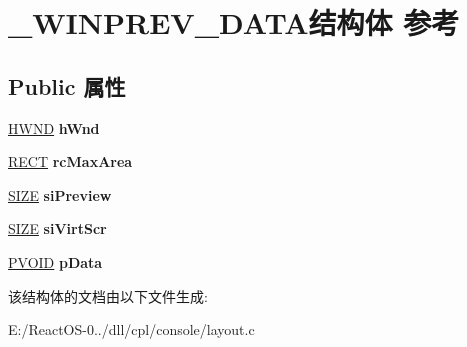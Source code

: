 \hypertarget{struct___w_i_n_p_r_e_v___d_a_t_a}{}\section{\+\_\+\+W\+I\+N\+P\+R\+E\+V\+\_\+\+D\+A\+T\+A结构体 参考}
\label{struct___w_i_n_p_r_e_v___d_a_t_a}
\subsection*{Public 属性}
\begin{DoxyCompactItemize}
\item 
\mbox{\label{struct___w_i_n_p_r_e_v___d_a_t_a_acf0d1ded946db1cfca1720317bf0321d}} 
\hyperlink{interfacevoid}{H\+W\+ND} {\bfseries h\+Wnd}
\item 
\mbox{\label{struct___w_i_n_p_r_e_v___d_a_t_a_a66a83b6289aa96a71e0d5b26944b5e81}} 
\hyperlink{structtag_r_e_c_t}{R\+E\+CT} {\bfseries rc\+Max\+Area}
\item 
\mbox{\label{struct___w_i_n_p_r_e_v___d_a_t_a_af1c503d8913d19f436f0fd1d3bda8470}} 
\hyperlink{structtag_s_i_z_e}{S\+I\+ZE} {\bfseries si\+Preview}
\item 
\mbox{\label{struct___w_i_n_p_r_e_v___d_a_t_a_a3b9d83493a759344fbfc7efb7a46c4cc}} 
\hyperlink{structtag_s_i_z_e}{S\+I\+ZE} {\bfseries si\+Virt\+Scr}
\item 
\mbox{\label{struct___w_i_n_p_r_e_v___d_a_t_a_a21c157e11b90a01b21f2eeb8c08600f6}} 
\hyperlink{interfacevoid}{P\+V\+O\+ID} {\bfseries p\+Data}
\end{DoxyCompactItemize}


该结构体的文档由以下文件生成\+:\begin{DoxyCompactItemize}
\item 
E\+:/\+React\+O\+S-\/0../dll/cpl/console/layout.\+c\end{DoxyCompactItemize}
